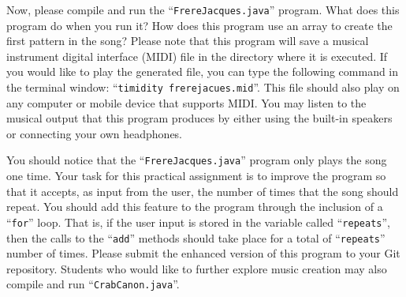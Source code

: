 Now, please compile and run the ``{\tt FrereJacques.java}'' program. What does this program do when you run it? How does
this program use an array to create the first pattern in the song? Please note that this program will save a musical
instrument digital interface (MIDI) file in the directory where it is executed. If you would like to play the generated
file, you can type the following command in the terminal window: ``{\tt timidity frerejacues.mid}''. This file should
also play on any computer or mobile device that supports MIDI. You may listen to the musical output that this program
produces by either using the built-in speakers or connecting your own headphones.

You should notice that the ``{\tt FrereJacques.java}'' program only plays the song one time. Your task for this
practical assignment is to improve the program so that it accepts, as input from the user, the number of times that the
song should repeat. You should add this feature to the program through the inclusion of a ``{\tt for}'' loop. That is,
if the user input is stored in the variable called ``{\tt repeats}'', then the calls to the ``{\tt add}'' methods should
take place for a total of ``{\tt repeats}'' number of times. Please submit the enhanced version of this program to your
Git repository.  Students who would like to further explore music creation may also compile and run
``{\tt CrabCanon.java}''.






